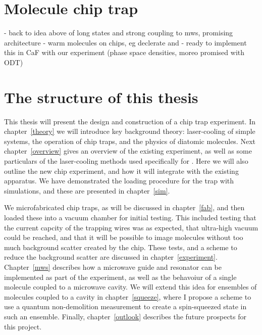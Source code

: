 \section{Molecule chip trap}

- back to idea above of long states and strong coupling to mws, promising
architecture \cite{Andre2006}
- warm molecules on chips, eg declerate \cite{Meek2008} and \cite{Meek2009}
- ready to implement this in CaF with our experiment (phase space densities,
moreo promised with ODT)

\section{The structure of this thesis}

This thesis will present the design and construction of a \CaF{} chip trap
experiment. In chapter~\ref{theory} we will introduce key background theory: 
laser-cooling of simple systems, the operation of chip traps, and the physics
of diatomic molecules. Next chapter~\ref{overview} gives an overview of the
existing \CaF{} experiment, as well as some particulars of the laser-cooling
methods used specifically for \CaF{}. Here we will also outline the new chip
experiment, and how it will integrate with the existing apparatus. We have
demonstrated the loading procedure for the trap with simulations, and these are
presented in chapter~\ref{sim}.

We microfabricated chip traps, as will be discussed in chapter~\ref{fab}, and
then loaded these into a vacuum chamber for initial testing. This included
testing that the current capcity of the trapping wires was as expected, that
ultra-high vacuum could be reached, and that it will be possible to image
molecules without too much background scatter created by the chip. These tests,
and a scheme to reduce the background scatter are discussed in
chapter~\ref{experiment}. Chapter~\ref{mws} describes how a microwave guide and
resonator can be implemented as part of the experiment, as well as the
behavoiur of a single molecule coupled to a microwave cavity. We will extend
this idea for ensembles of molecules coupled to a cavity in
chapter~\ref{squeeze}, where I propose a scheme to use a quantum non-demolition
measurement to create a spin-squeezed state in such an ensemble. Finally,
chapter~\ref{outlook} describes the future prospects for this project.
